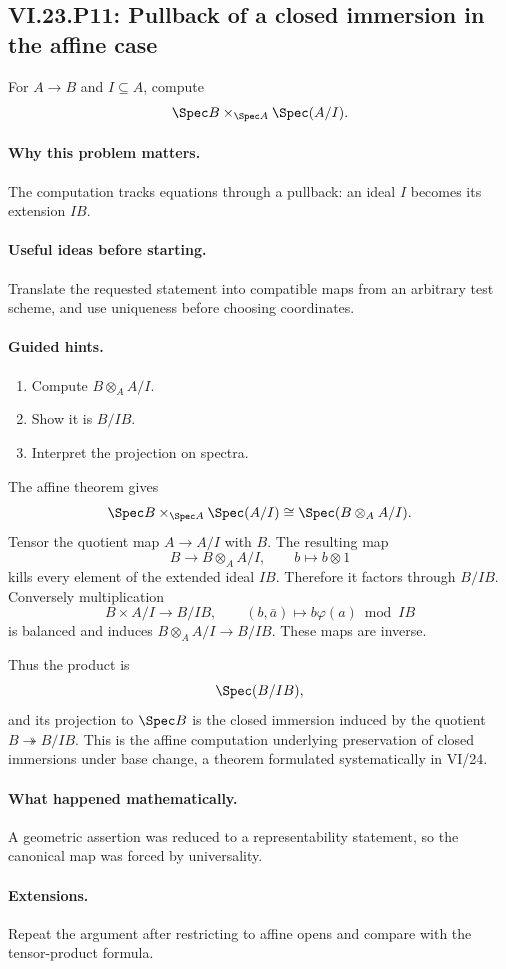 \subsection*{VI.23.P11: Pullback of a closed immersion in the affine case}
\begin{problem}\label{prob:vi23-p11}
For $A\to B$ and $I\subseteq A$, compute
\[
\Spec B\times_{\Spec A}\Spec(A/I).
\]
\end{problem}

\ifdefined\FullProblemDossiers
\paragraph{Why this problem matters.}
The computation tracks equations through a pullback: an ideal $I$ becomes its extension $IB$.

\paragraph{Useful ideas before starting.}
Translate the requested statement into compatible maps from an arbitrary test scheme, and use uniqueness before choosing coordinates.

\paragraph{Guided hints.}
\begin{enumerate}
\item Compute $B\otimes_AA/I$.
\item Show it is $B/IB$.
\item Interpret the projection on spectra.
\end{enumerate}

\begin{solution}
The affine theorem gives
\[
\Spec B\times_{\Spec A}\Spec(A/I)
\cong\Spec(B\otimes_AA/I).
\]
Tensor the quotient map $A\to A/I$ with $B$.  The resulting map
\[
B\to B\otimes_AA/I,\qquad b\mapsto b\otimes1
\]
kills every element of the extended ideal $IB$.  Therefore it factors through $B/IB$.
Conversely multiplication
\[
B\times A/I\to B/IB,\qquad (b,\bar a)\mapsto b\varphi(a)\bmod IB
\]
is balanced and induces $B\otimes_AA/I\to B/IB$.  These maps are inverse.

Thus the product is
\[
\Spec(B/IB),
\]
and its projection to $\Spec B$ is the closed immersion induced by the quotient
$B\twoheadrightarrow B/IB$.  This is the affine computation underlying preservation of closed
immersions under base change, a theorem formulated systematically in VI/24.
\end{solution}

\paragraph{What happened mathematically.}
A geometric assertion was reduced to a representability statement, so the canonical map was forced by universality.

\paragraph{Extensions.}
Repeat the argument after restricting to affine opens and compare with the tensor-product formula.
\fi
